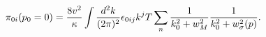 \begin{equation}\label{tensorI}
{\cal{\pi}}_{0i}(p_0=0)= \frac{8 v^2}{\kappa}\int
\frac{d^2k}{(2 \pi)^2} \epsilon_{0ij} k^j T \sum_{n}\frac{1}{k_0^2 +
w_M^2} \frac{1}{k_0^2 + w_{\sigma}^2(p)}.
\end{equation}

